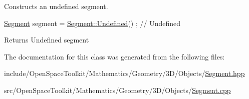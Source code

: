 Constructs an undefined segment. 


\begin{DoxyCode}
\hyperlink{classostk_1_1math_1_1geom_1_1d3_1_1objects_1_1_segment_aa2cb60ce06335a5f76120c658219494c}{Segment} segment = \hyperlink{classostk_1_1math_1_1geom_1_1d3_1_1objects_1_1_segment_a488c219e6e6a137981df83b9d247f2bf}{Segment::Undefined}() ; \textcolor{comment}{// Undefined}
\end{DoxyCode}


\begin{DoxyReturn}{Returns}
Undefined segment 
\end{DoxyReturn}


The documentation for this class was generated from the following files\+:\begin{DoxyCompactItemize}
\item 
include/\+Open\+Space\+Toolkit/\+Mathematics/\+Geometry/3\+D/\+Objects/\hyperlink{3_d_2_objects_2_segment_8hpp}{Segment.\+hpp}\item 
src/\+Open\+Space\+Toolkit/\+Mathematics/\+Geometry/3\+D/\+Objects/\hyperlink{3_d_2_objects_2_segment_8cpp}{Segment.\+cpp}\end{DoxyCompactItemize}
